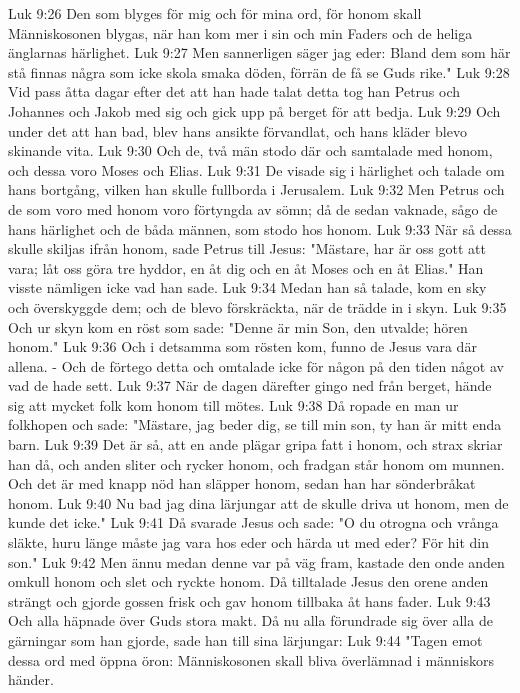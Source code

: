 Luk 9:26  Den som blyges för mig och för mina ord, för honom skall Människosonen blygas, när han kom mer i sin och min Faders och de heliga änglarnas härlighet.
Luk 9:27  Men sannerligen säger jag eder: Bland dem som här stå finnas några som icke skola smaka döden, förrän de få se Guds rike."
Luk 9:28  Vid pass åtta dagar efter det att han hade talat detta tog han Petrus och Johannes och Jakob med sig och gick upp på berget för att bedja.
Luk 9:29  Och under det att han bad, blev hans ansikte förvandlat, och hans kläder blevo skinande vita.
Luk 9:30  Och de, två män stodo där och samtalade med honom, och dessa voro Moses och Elias.
Luk 9:31  De visade sig i härlighet och talade om hans bortgång, vilken han skulle fullborda i Jerusalem.
Luk 9:32  Men Petrus och de som voro med honom voro förtyngda av sömn; då de sedan vaknade, sågo de hans härlighet och de båda männen, som stodo hos honom.
Luk 9:33  När så dessa skulle skiljas ifrån honom, sade Petrus till Jesus: "Mästare, har är oss gott att vara; låt oss göra tre hyddor, en åt dig och en åt Moses och en åt Elias." Han visste nämligen icke vad han sade.
Luk 9:34  Medan han så talade, kom en sky och överskyggde dem; och de blevo förskräckta, när de trädde in i skyn.
Luk 9:35  Och ur skyn kom en röst som sade: "Denne är min Son, den utvalde; hören honom."
Luk 9:36  Och i detsamma som rösten kom, funno de Jesus vara där allena. - Och de förtego detta och omtalade icke för någon på den tiden något av vad de hade sett.
Luk 9:37  När de dagen därefter gingo ned från berget, hände sig att mycket folk kom honom till mötes.
Luk 9:38  Då ropade en man ur folkhopen och sade: "Mästare, jag beder dig, se till min son, ty han är mitt enda barn.
Luk 9:39  Det är så, att en ande plägar gripa fatt i honom, och strax skriar han då, och anden sliter och rycker honom, och fradgan står honom om munnen. Och det är med knapp nöd han släpper honom, sedan han har sönderbråkat honom.
Luk 9:40  Nu bad jag dina lärjungar att de skulle driva ut honom, men de kunde det icke."
Luk 9:41  Då svarade Jesus och sade: "O du otrogna och vrånga släkte, huru länge måste jag vara hos eder och härda ut med eder? För hit din son."
Luk 9:42  Men ännu medan denne var på väg fram, kastade den onde anden omkull honom och slet och ryckte honom. Då tilltalade Jesus den orene anden strängt och gjorde gossen frisk och gav honom tillbaka åt hans fader.
Luk 9:43  Och alla häpnade över Guds stora makt. Då nu alla förundrade sig över alla de gärningar som han gjorde, sade han till sina lärjungar:
Luk 9:44  "Tagen emot dessa ord med öppna öron: Människosonen skall bliva överlämnad i människors händer.
